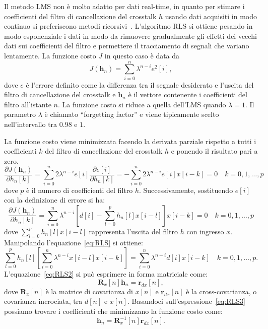 \documentclass[12pt,a4paper,titlepage]{article}
\begin{document}
Il metodo LMS non è molto adatto per dati real-time, in quanto per stimare i coefficienti del filtro di cancellazione del crosstalk $h$ usando dati acquisiti in modo continuo si preferiscono metodi ricorsivi~\cite{Ifeachor:DSP}. L'algoritmo RLS si ottiene pesando in modo esponenziale i dati in modo da rimuovere gradualmente gli effetti dei vecchi dati sui coefficienti del filtro e permettere il tracciamento di segnali che variano lentamente. La funzione costo $J$ in questo caso è data da
\begin{equation*}
J(\mathbf{h}_n) = \sum_{i = 0}^{n} \lambda^{n-i}e^2[i],
\end{equation*}
dove $e$ è l'errore definito come la differenza tra il segnale desiderato e l'uscita del filtro di cancellazione del crosstalk e $\mathbf{h}_n$ è il vettore contenente i coefficienti del filtro all'istante $n$. La funzione costo si riduce a quella dell'LMS quando $\lambda = 1$. Il parametro $\lambda$ è chiamato ``forgetting factor'' e viene tipicamente scelto nell'intervallo tra $0.98$ e $1$. 

La funzione costo viene minimizzata facendo la derivata parziale rispetto a tutti i coefficienti $k$ del filtro di cancellazione del crosstalk $h$ e ponendo il risultato pari a zero.
\begin{equation*}
\dfrac{\partial J(\mathbf{h}_n)}{\partial h_n[k]} =  \sum_{i = 0}^{n} 2\lambda^{n-i}e[i]\dfrac{\partial e[i]}{\partial h_n[k]} = - \sum_{i = 0}^{n} 2\lambda^{n-i}e[i]x[i-k] = 0 \quad k = 0, 1, \dots, p
\end{equation*}
dove $p$ è il numero di coefficienti del filtro $h$. Successivamente, sostituendo $e[i]$ con la definizione di errore si ha:
\begin{equation}\label{eq:RLS}
\dfrac{\partial J(\mathbf{h}_n)}{\partial h_n[k]} = \sum_{i = 0}^{n}\lambda^{n-i}\left[d[i] -\sum_{l=0}^{p} {h_n[l]x[i-l]}\right] x[i-k] = 0 \quad k = 0, 1, \dots, p
\end{equation} 
dove $\sum_{l=0}^{p} {h_n[l]x[i-l]}$ rappresenta l'uscita del filtro $h$ con ingresso $x$. Manipolando l'equazione~\eqref{eq:RLS} si ottiene:
\begin{equation}\label{eq:RLS2}
\sum_{l=0}^{p} {h_n[l]} \left[\sum_{i=0}^{n} \lambda^{n-i}x[i-l]x[i-k]\right] = \sum_{i=0}^{n} \lambda^{n-i} d[i]x[i-k] \quad k = 0, 1,\dots, p.
\end{equation}\label{eq:RLS3}
L'equazione~\eqref{eq:RLS2} si può esprimere in forma matriciale come:
\begin{equation}
\mathbf{R}_x[n]\mathbf{h}_n = \mathbf{r}_{dx}[n],
\end{equation}
dove $\mathbf{R}_x[n]$ è la matrice di covarianza di $x[n]$ e $\mathbf{r}_{dx}[n]$ è la cross-covarianza, o covarianza incrociata, tra $d[n]$ e $x[n]$. Basandoci sull'espressione~\eqref{eq:RLS3} possiamo trovare i coefficienti che minimizzano la funzione costo come:
\begin{equation*}
\mathbf{h}_n = \mathbf{R}^{-1}_x[n]\mathbf{r}_{dx}[n].
\end{equation*}
\end{document}

